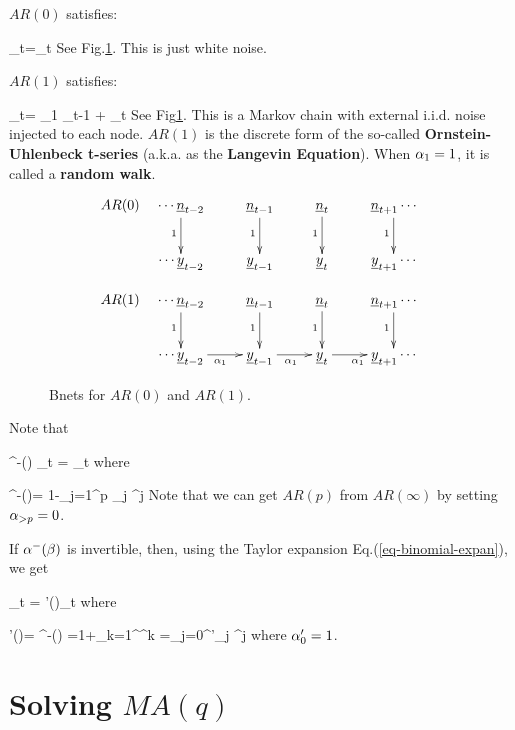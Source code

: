 $AR(0)$ satisfies:

\beq
\rvy_t=\rvn_t
\eeq
See Fig.\ref{fig-AR-0-1}.
This is just white noise.


$AR(1)$ satisfies:

\beq
\rvy_t= \alp_1 \rvy_{t-1} + \rvn_t
\eeq
See Fig\ref{fig-AR-0-1}.
This  is a Markov chain
with external i.i.d. noise injected
to each node.
$AR(1)$
is the discrete
form of the
so-called {\bf Ornstein-Uhlenbeck
 t-series} (a.k.a. as the {\bf Langevin
 Equation}).
 When $\alpha_1=1$,
it is called a {\bf random walk}.

\begin{figure}[h!]
$$
\begin{array}{cc}
AR(0)&
\xymatrix{
\cdots
\rvn_{t-2}\ar[d]_1
&\rvn_{t-1}\ar[d]_1
&\rvn_{t}\ar[d]_1
&\rvn_{t+1}\ar[d]_1
\cdots
\\
\cdots
\rvy_{t-2}
&\rvy_{t-1}
&\rvy_{t}
&\rvy_{t+1}
\cdots
}
\\
\\
AR(1)&
\xymatrix{
\cdots
\rvn_{t-2}\ar[d]_1
&\rvn_{t-1}\ar[d]_1
&\rvn_{t}\ar[d]_1
&\rvn_{t+1}\ar[d]_1
\cdots
\\
\cdots
\rvy_{t-2}\ar[r]_{\alp_1}
&\rvy_{t-1}\ar[r]_{\alp_1}
&\rvy_{t}\ar[r]_{\alp_1}
&\rvy_{t+1}
\cdots
}
\end{array}
$$
\caption{Bnets for $AR(0)$ and $AR(1)$.}
\label{fig-AR-0-1}
\end{figure}


Note that

\beq
\alp^-(\calb)
\rvy_t = \rvn_t
\label{eq-ar-alp-minus}
\;
\eeq
where

\beq
\alp^-(\calb)=
1-\sum_{j=1}^p
 \alp_j \calb^j
\eeq
Note that we can get $AR(p)$
from $AR(\infty)$
by setting $\alpha_{>p}=0$.


If $\alpha^-(\beta)$
is invertible, then, using
the Taylor expansion
Eq.(\ref{eq-binomial-expan}), we get

\beq
\rvy_t = \alp'(\calb)\rvn_t
\eeq
where

\beq
\alp'(\calb)=
{\alp^-(\calb)}
=1+\sum_{k=1}^\infty\left[\sum_{j=1}^p\alp_j \calb^j
\right]^k
=\sum_{j=0}^\infty \alp'_j \calb^j
\eeq
where $\alpha'_0=1$.








\section{Solving $MA(q)$}


